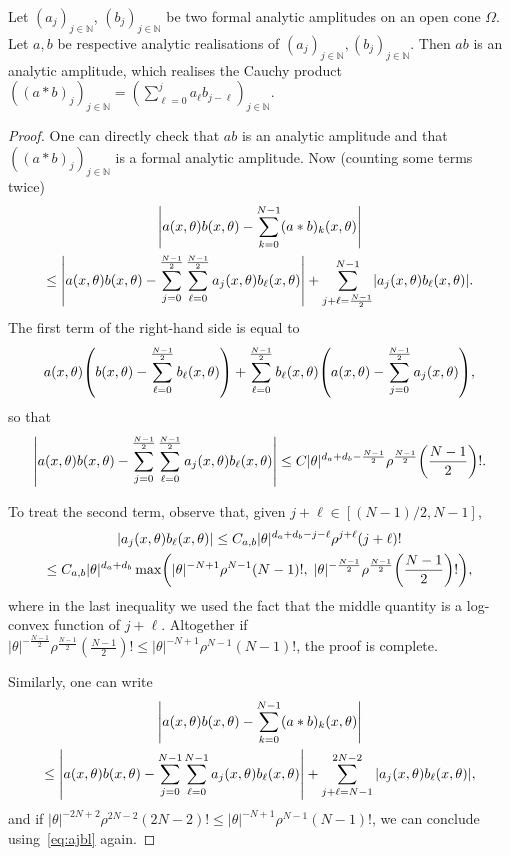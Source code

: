 \documentclass[AHL,Unicode,longabstracts,published]{cedram}
\newcommand\1{\mathds{1}}
\newcommand{\N}{\mathbb{N}}
\let\originalleft\left
\let\originalright\right
\renewcommand{\left}{\mathopen{}\mathclose\bgroup\originalleft}
\renewcommand{\right}{\aftergroup\egroup\originalright}
\begin{document}
\begin{prop}\label{prop:Cauchy_product}
Let $(a_j)_{j\in \N}$, $(b_j)_{j\in \N}$ be two formal analytic amplitudes on an open cone $\Omega$. Let $a,b$ be respective analytic realisations of $(a_j)_{j\in \N},(b_j)_{j\in \N}$. Then $ab$ is an analytic amplitude, which realises the Cauchy product $((a*b)_j)_{j\in \N}=(\sum_{\ell=0}^ja_{\ell}b_{j-\ell})_{j\in \N}$.
\end{prop}
\begin{proof}
One can directly check that $ab$ is an analytic amplitude and that\linebreak $((a*b)_j)_{j\in \N}$ is a formal analytic amplitude. Now (counting some terms twice)
\begin{multline*}
\left|a(x,\theta)b(x,\theta)-\sum_{k=0}^{N-1}(a*b)_k(x,\theta)\right|\\ \leq
\left|a(x,\theta)b(x,\theta)-\sum_{j=0}^{\frac{N-1}{2}}\sum_{\ell=0}^{\frac{N-1}{2}}a_j(x,\theta)b_\ell(x,\theta)\right|+\sum_{j+\ell=\frac{N-1}{2}}^{N-1}
\left|a_j(x,\theta)b_{\ell}(x,\theta)\right|.
\end{multline*}
The first term of the right-hand side is equal to
\[
a(x,\theta)\left(b(x,\theta)-\sum_{\ell=0}^{\frac{N-1}{2}}b_\ell(x,\theta)\right)+\sum_{\ell=0}^{\frac{N-1}{2}}b_{\ell}(x,\theta)\left(a(x,\theta)-\sum_{j=0}^{\frac{N-1}{2}}a_j(x,\theta)\right),
\]
so that
\[
\left|a(x,\theta)b(x,\theta)-\sum_{j=0}^{\frac{N-1}{2}}\sum_{\ell=0}^{\frac{N-1}{2}}a_j(x,\theta)b_\ell(x,\theta)\right|\leq C|\theta|^{d_a+d_b-\frac{N-1}{2}}\rho^{\frac{N-1}{2}}\left(\frac{N-1}{2}\right)!.
\]

To treat the second term, observe that, given $j+\ell\in [(N-1)/2,N-1]$,
\begin{multline}\label{eq:ajbl}
|a_j(x,\theta)b_{\ell}(x,\theta)|\leq C_{a,b}|\theta|^{d_a+d_b-j-\ell}\rho^{j+\ell}(j+\ell)!\\ \leq C_{a,b}|\theta|^{d_a+d_b}\max\left(|\theta|^{-N+1}\rho^{N-1}(N-1)!,\;|\theta|^{-\frac{N-1}{2}}\rho^{\frac{N-1}{2}}\left(\frac{N-1}{2}\right)!\right),
\end{multline}
where in the last inequality we used the fact that the middle quantity is a log-convex function of $j+\ell$. Altogether if $|\theta|^{-\frac{N-1}{2}}\rho^{\frac{N-1}{2}}(\frac{N-1}{2})!\leq |\theta|^{-N+1}\rho^{N-1}(N-1)!$, the proof is complete.

Similarly, one can write
\begin{multline*}
\left|a(x,\theta)b(x,\theta)-\sum_{k=0}^{N-1}(a*b)_k(x,\theta)\right|\\ \leq
\left|a(x,\theta)b(x,\theta)-\sum_{j=0}^{N-1}\sum_{\ell=0}^{N-1}a_j(x,\theta)b_\ell(x,\theta)\right|+\sum_{j+\ell=N-1}^{2N-2}|a_j(x,\theta)b_{\ell}(x,\theta)|,
\end{multline*}
and if $|\theta|^{-2N+2}\rho^{2N-2}(2N-2)!\leq |\theta|^{-N+1}\rho^{N-1}(N-1)!$, we can conclude using~\eqref{eq:ajbl} again.


\end{proof}
\end{document}
